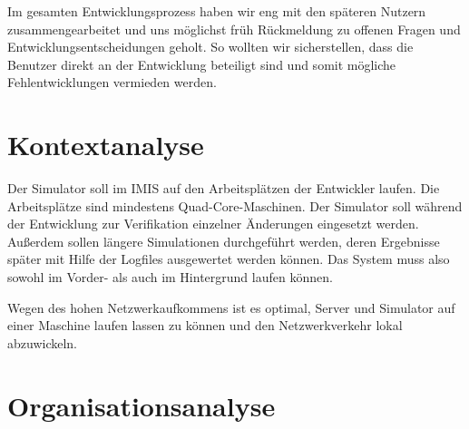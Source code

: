 Im gesamten Entwicklungsprozess haben wir eng mit den späteren Nutzern zusammengearbeitet und uns möglichst früh Rückmeldung zu offenen Fragen und Entwicklungsentscheidungen geholt. So wollten wir sicherstellen, dass die Benutzer direkt an der Entwicklung beteiligt sind und somit mögliche Fehlentwicklungen vermieden werden.


\section{Kontextanalyse}\label{sec:context_ana}
Der Simulator soll im IMIS auf den Arbeitsplätzen der Entwickler laufen. Die Arbeitsplätze sind mindestens Quad-Core-Maschinen. Der Simulator soll während der Entwicklung zur Verifikation einzelner Änderungen eingesetzt werden. Außerdem sollen längere Simulationen durchgeführt werden, deren Ergebnisse später mit Hilfe der Logfiles ausgewertet werden können. Das System muss also sowohl im Vorder- als auch im Hintergrund laufen können.

Wegen des hohen Netzwerkaufkommens ist es optimal, Server und Simulator auf einer Maschine laufen lassen zu können und den Netzwerkverkehr lokal abzuwickeln.


\section{Organisationsanalyse}\label{sec:orga_ana}

